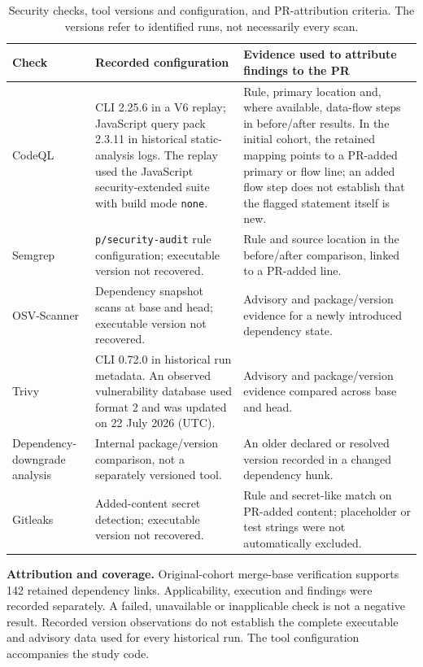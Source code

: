 \begin{table}[H]
\caption{Security checks, tool versions and configuration, and PR-attribution criteria. The versions refer to identified runs, not necessarily every scan.}
\label{tab:scanners}
\footnotesize\renewcommand{\arraystretch}{1.15}
\begin{tabularx}{\linewidth}{@{}L{1.65cm}L{3.05cm}Y@{}}
\toprule
\textbf{Check} & \textbf{Recorded configuration} & \textbf{Evidence used to attribute findings to the PR}\\
\midrule
CodeQL & CLI 2.25.6 in a V6 replay; JavaScript query pack 2.3.11 in historical static-analysis logs. The replay used the JavaScript security-extended suite with build mode \texttt{none}. & Rule, primary location and, where available, data-flow steps in before/after results. In the initial cohort, the retained mapping points to a PR-added primary or flow line; an added flow step does not establish that the flagged statement itself is new.\\
Semgrep & \texttt{p/security-audit} rule configuration; executable version not recovered. & Rule and source location in the before/after comparison, linked to a PR-added line.\\
OSV-Scanner & Dependency snapshot scans at base and head; executable version not recovered. & Advisory and package/version evidence for a newly introduced dependency state.\\
Trivy & CLI 0.72.0 in historical run metadata. An observed vulnerability database used format 2 and was updated on 22 July 2026 (UTC). & Advisory and package/version evidence compared across base and head.\\
Dependency-downgrade analysis & Internal package/version comparison, not a separately versioned tool. & An older declared or resolved version recorded in a changed dependency hunk.\\
Gitleaks & Added-content secret detection; executable version not recovered. & Rule and secret-like match on PR-added content; placeholder or test strings were not automatically excluded.\\
\bottomrule
\end{tabularx}
\par\smallskip\raggedright\scriptsize
\textbf{Attribution and coverage.} Original-cohort merge-base verification supports 142 retained dependency links. Applicability, execution and findings were recorded separately. A failed, unavailable or inapplicable check is not a negative result. Recorded version observations do not establish the complete executable and advisory data used for every historical run. The tool configuration accompanies the study code.
\end{table}

